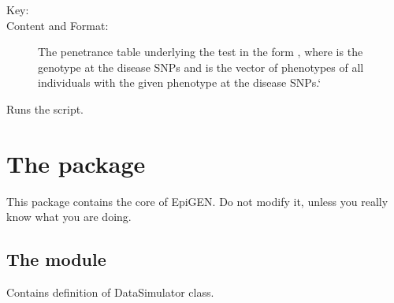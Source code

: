 \documentclass[a4paper,10pt,english]{sphinxhowto}
\begin{document}
\begin{description}
\begin{description}
\begin{description}
\end{description}

\item[{\sphinxcode{\sphinxupquote{\textless{}PENETRANCE\_TABLE\textgreater{}}}}] \leavevmode\begin{description}
\item[{Key:}] \leavevmode
{}

\item[{Content and Format:}] \leavevmode
The penetrance table underlying the test in the form , where  is
the genotype at the disease SNPs and  is the vector of phenotypes of all individuals with the
given phenotype at the disease SNPs.{}`

\end{description}

\end{description}

\end{description}

\begin{fulllineitems}
\label{\detokenize{validate_simulated_data:validate_simulated_data.run_script}}
Runs the script.

\end{fulllineitems}



\section{The package }
\label{\detokenize{utils:the-package-utils}}\label{\detokenize{utils::doc}}
This package contains the core of EpiGEN. Do not modify it, unless you really know what you are doing.


\subsection{The module }
\label{\detokenize{utils:module-utils.data_simulator}}\label{\detokenize{utils:the-module-utils-data-simulator-py}}
Contains definition of DataSimulator class.
\end{document}
